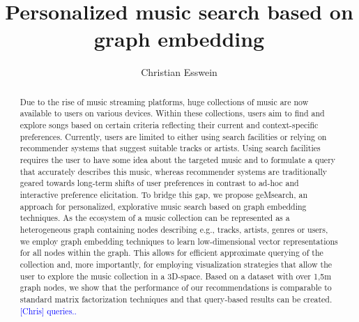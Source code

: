 \documentclass[sigconf]{acmart}
\newcommand{\ce}[1]{\textcolor{blue}{[Chris] #1}}
\newcommand{\ce}[1]{}
\begin{document}
\title{Personalized music search based on graph embedding}


\author{Christian Esswein}



\begin{abstract}
	
	Due to the rise of music streaming platforms, huge collections of music are now available to users on various devices. Within these collections, users aim to find and explore songs based on certain criteria reflecting their current and context-specific preferences. Currently, users are limited to either using search facilities or relying on recommender systems that suggest suitable tracks or artists. Using search facilities requires the user to have some idea about the targeted music and to formulate a query that accurately describes this music, whereas recommender systems are traditionally geared towards long-term shifts of user preferences in contrast to ad-hoc and interactive preference elicitation. To bridge this gap, we propose geMsearch, an approach for personalized, explorative music search based on graph embedding techniques. As the ecosystem of a music collection can be represented as a heterogeneous graph containing nodes describing e.g., tracks, artists, genres or users, we employ graph embedding techniques to learn low-dimensional vector representations for all nodes within the graph. This allows for efficient approximate querying of the collection and, more importantly, for employing visualization strategies that allow the user to explore the music collection in a 3D-space. Based on a dataset with over 1,5m graph nodes, we show that the performance of our recommendations is comparable to standard matrix factorization techniques and that query-based results can be created.\ce{queries..}
	
\end{abstract}
\end{document}
